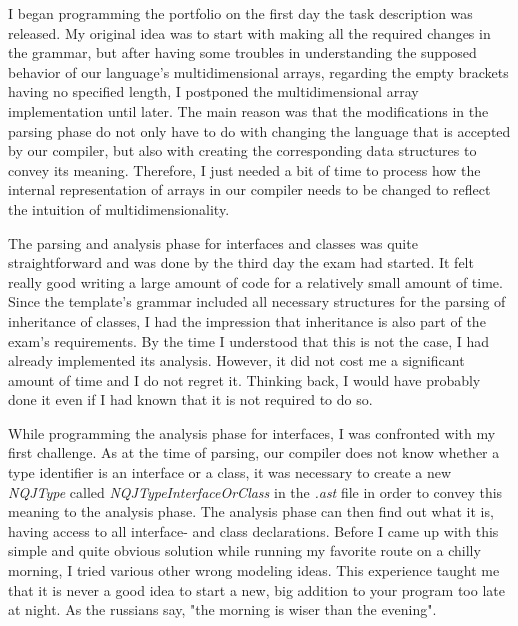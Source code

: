 I began programming the portfolio on the first day the task description was released.
My original idea was to start with making all the required changes in the grammar,
but after having some troubles in understanding the supposed behavior of our
language's multidimensional arrays, regarding the empty brackets having no specified length,
I postponed the multidimensional array implementation until later.
The main reason was that the modifications in the parsing phase do not only
have to do with changing the language that is accepted by our compiler, but also
with creating the corresponding data structures to convey its meaning.
Therefore, I just needed a bit of time to process how the internal representation of arrays
in our compiler needs to be changed to reflect the intuition of multidimensionality.

The parsing and analysis phase for interfaces and classes was
quite straightforward and was done by the third day the exam had started.
It felt really good writing a large amount of code for a 
relatively small amount of time. 
Since the template's grammar included all necessary structures for
the parsing of inheritance of classes, I had the impression that inheritance is
also part of the exam's requirements. By the time I understood that this is
not the case, I had already implemented its analysis.
However, it did not cost me a significant amount of time and I do not regret it.
Thinking back, I would
have probably done it even if I had known that it is not required to do so.

While programming the analysis phase for interfaces, I was confronted with my first challenge.
As at the time of parsing, our compiler does not know whether a type identifier
is an interface or a class, it was necessary to create a new \textit{NQJType}
called \textit{NQJTypeInterfaceOrClass} in the \textit{.ast} file in order to
convey this meaning to the analysis phase.
The analysis phase can then find out what it is, having access to
all interface- and class declarations.
Before I came up with this simple and quite obvious solution while
running my favorite route on a chilly morning, I tried various other wrong
modeling ideas. This experience taught me that it is never a good idea
to start a new, big addition to your program too late at night.
As the russians say, "the morning is wiser than the evening".

